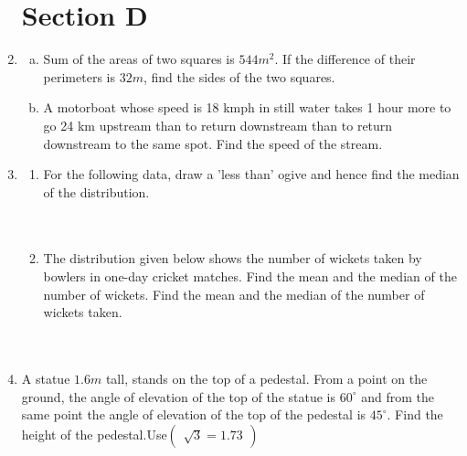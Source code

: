 \documentclass[journal,12pt,twocolumn]{IEEEtran}
\newcommand{\myvec}[1]{\ensuremath{\begin{pmatrix}#1\end{pmatrix}}}
\begin{document}
\begin{enumerate}[label=4.\arabic*]
\section{Section D}
    \item \begin{enumerate}[a)]
        \item Sum of the areas of two squares is $544 m^2$. If the difference of their perimeters is $32m$, find the sides of the two squares.\\
        \item A motorboat whose speed is 18 kmph in still water takes 1 hour more to go 24 km upstream than to return downstream than to return downstream to the same spot. Find the speed of the stream.\\
    \end{enumerate}
    \item \begin{enumerate}
        \item For the following data, draw a 'less than' ogive and hence find the median of the distribution.\\
     \vspace{2mm}\\
    \vspace{2mm}\\
    \item The distribution given below shows the number of wickets taken by bowlers in one-day cricket matches. Find the mean and the median of the number of wickets. Find the mean and the median of the number of wickets taken.\\
     \vspace{2mm}\\
    \vspace{2mm}\\
    \end{enumerate}
    \item A statue $1.6m$ tall, stands on the top of a pedestal. From a point on the ground,  the angle of elevation of the top of the statue is $60^\circ$ and from the same point the angle of elevation of the top of the pedestal is $45^\circ$. Find the height of the pedestal.Use$\myvec{\sqrt{3} = 1.73}$\\
    

\end{enumerate}
\end{document}
